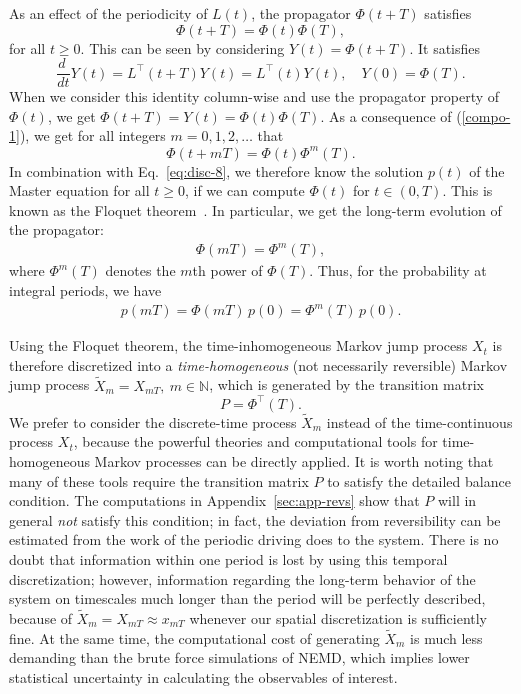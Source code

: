 \documentclass[journal=jctcce,manuscript=article]{achemso}
\newcommand{\vect}[1]{#1}
\newcommand{\myphi}{\Phi}
\begin{document}
As an effect of the periodicity of $\vect L(t)$, the propagator $\myphi(t+T)$
satisfies
\begin{equation}\label{compo-1}
\myphi(t+T)=\myphi(t)\myphi(T),
\end{equation}
for all $t\ge 0$. This can be seen by considering $\vect Y(t)=\myphi(t+T)$. It satisfies
\[
\frac{d\ }{dt}\vect Y(t)=\vect L^{\top}(t+T) \vect Y(t)=\vect L^{\top}(t)\vect Y(t),\quad \vect Y(0)=\myphi(T).
\]
When we consider this identity column-wise and use the propagator property of $\myphi(t)$, we get $\myphi(t+T)=\vect Y(t)=\myphi(t)\myphi(T)$. As a consequence of (\ref{compo-1}), we get for all integers $m=0,1,2,\ldots$ that 
\begin{equation}\label{compo-2}
\myphi(t+mT)=\myphi(t)\myphi^m(T).
\end{equation}
In combination with Eq.~\eqref{eq:disc-8}, we therefore
know the solution $\vect p(t)$ of the Master equation for all $t\ge 0$,
if we can compute $\myphi(t)$ for $t\in (0,T)$.
This is known as the Floquet theorem~\cite{floquet1883equations}.
In particular, we get the long-term evolution of the propagator:
\begin{align}
\label{eq:floq-13}  
\myphi(mT)=\myphi^m(T),
\end{align}
where $\myphi^m(T)$ denotes the $m$th power of $\myphi(T)$. Thus, for the probability at integral periods, we have
\begin{align}
  \label{eq:floq-dynamics}
  p(mT) =  \myphi(mT)\, p(0) = \myphi^m(T)\, p(0).
\end{align}


Using the Floquet theorem, the time-inhomogeneous Markov jump process $X_t$
is therefore discretized into a \emph{time-homogeneous} (not necessarily
reversible) Markov jump process $\tilde X_{m} = X_{mT}, \ m\in\mathbb
N$, which is generated by the transition matrix
\begin{equation}\label{P}
\vect P=\myphi^{\top}(T).
\end{equation}
We prefer to consider the discrete-time process $\tilde X_{m}$ instead of the time-continuous process $X_t$,
because the powerful theories and
computational tools for time-homogeneous Markov processes can be directly applied. It is worth noting that many of these tools require the transition matrix $P$ to satisfy the detailed balance condition. The computations in Appendix~\ref{sec:app-revs} show that $P$ will in general \emph{not} satisfy this condition; in fact,  the deviation {from} reversibility can be estimated from the work of the periodic driving does to the system.
There is no doubt that information within one period is lost by using this temporal
discretization; however, information regarding the long-term behavior of the system on timescales
much longer than the period will be perfectly described, because of $\tilde X_{m} = X_{mT}\approx x_{mT}$ whenever our spatial discretization is sufficiently fine.
At the same time,
the computational cost of generating $\tilde X_{m}$ is much less demanding
than the brute force simulations of NEMD, which implies lower
statistical uncertainty in calculating the observables of interest.
\end{document}
